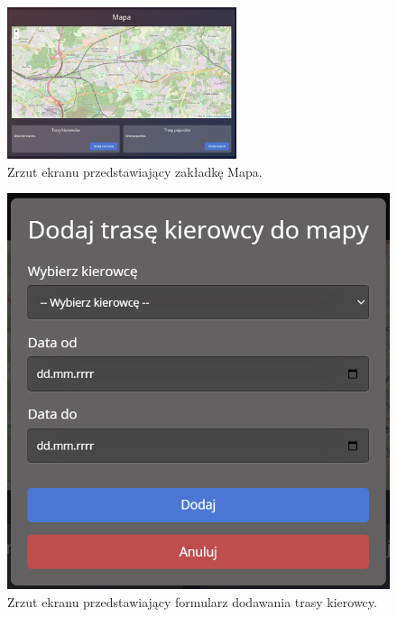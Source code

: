 \begin{figure}
	\centering
	\includegraphics[width=0.6\textwidth]{./graf/map_tab.png}
	\caption{Zrzut ekranu przedstawiający zakładkę Mapa.}
	\label{fig:4.14}
\end{figure}

\begin{figure}
	\centering
	\includegraphics[width=1\textwidth]{./graf/add_driver_route.png}
	\caption{Zrzut ekranu przedstawiający formularz dodawania trasy kierowcy.}
	\label{fig:4.15}
\end{figure}

